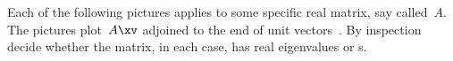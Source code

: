 \sectionExercises

\begin{exercise} \label{ex:} 
Each of the following pictures applies to some specific real matrix, say called~\(A\).
The pictures plot~\(A\xv\) adjoined to the end of unit vectors~\xv.
By inspection decide whether the matrix, in each case, has real eigenvalues or s.

\begin{parts}
\item {}

\item {}

\item {}

\item {}

\item {}

\item {}

\item {}

\item {}

\end{parts}
\end{exercise}








